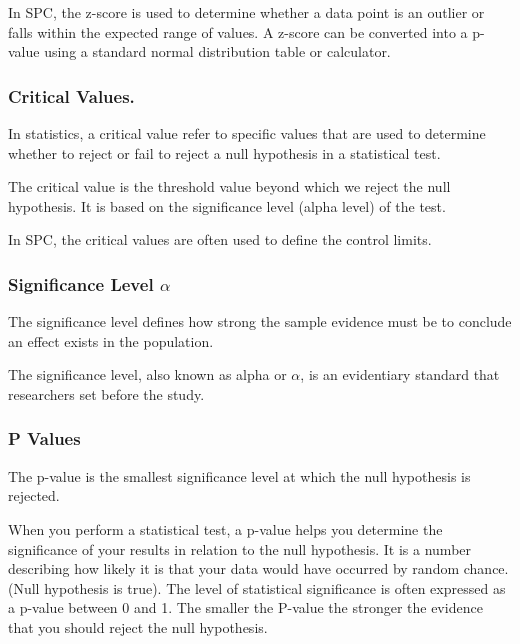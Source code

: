 \documentclass[11pt]{article}
\begin{document}
In SPC, the z-score is used to determine whether a data point is an
outlier or falls within the expected range of values. A z-score can be
converted into a p-value using a standard normal distribution table or
calculator.

\hypertarget{critical-values.}{%
\subsubsection{Critical Values.}\label{critical-values.}}

In statistics, a critical value refer to specific values that are used
to determine whether to reject or fail to reject a null hypothesis in a
statistical test.

The critical value is the threshold value beyond which we reject the
null hypothesis. It is based on the significance level (alpha level) of
the test.

In SPC, the critical values are often used to define the control limits.

\hypertarget{significance-level-alpha}{%
\subsubsection{\texorpdfstring{Significance Level
\(\alpha\)}{Significance Level \textbackslash alpha}}\label{significance-level-alpha}}

The significance level defines how strong the sample evidence must be to
conclude an effect exists in the population.

The significance level, also known as alpha or \(\alpha\), is an
evidentiary standard that researchers set before the study.

\hypertarget{p-values}{%
\subsubsection{P Values}\label{p-values}}

The p-value is the smallest significance level at which the null
hypothesis is rejected.

When you perform a statistical test, a p-value helps you determine the
significance of your results in relation to the null hypothesis. It is a
number describing how likely it is that your data would have occurred by
random chance. (Null hypothesis is true). The level of statistical
significance is often expressed as a p-value between 0 and 1. The
smaller the P-value the stronger the evidence that you should reject the
null hypothesis.
\end{document}
